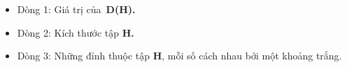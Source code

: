 \begin{itemize}
	\item Dòng 1: Giá trị của \textbf{D(H)}\textbf{.}
	\item Dòng 2: Kích thước tập \textbf{H}\textbf{.}
	\item Dòng 3: Những đỉnh thuộc tập \textbf{H}, mỗi số cách nhau bởi một khoảng trắng.
\end{itemize}